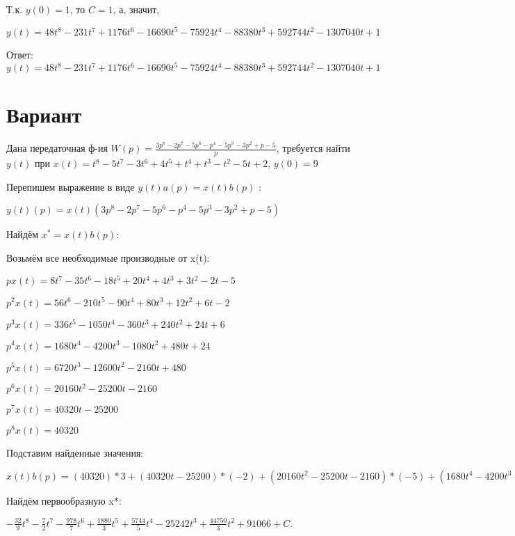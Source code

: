 \documentclass{article}
\begin{document}
{{{{{Т.к. $y(0)=1$, то $C=1$, а, значит, 

$y(t)=48t^{8}-231t^{7}+1176t^{6}-16690t^{5}-75924t^{4}-88380t^{3}+592744t^{2}-1307040t+1$

Ответ: $y(t) = 48t^{8}-231t^{7}+1176t^{6}-16690t^{5}-75924t^{4}-88380t^{3}+592744t^{2}-1307040t+1$

\section{Вариант}

Дана передаточная ф-ия $W(p)=\frac{3p^{8}-2p^{7}-5p^{6}-p^{4}-5p^{3}-3p^{2}+p-5}{p}$, требуется найти $y(t)$ при $x(t)=t^{8}-5t^{7}-3t^{6}+4t^{5}+t^{4}+t^{3}-t^{2}-5t+2$, $y(0)=9$

Перепишем выражение в виде $y(t)a(p)=x(t)b(p)$ :

$y(t)(p)=x(t)(3p^{8}-2p^{7}-5p^{6}-p^{4}-5p^{3}-3p^{2}+p-5)$

Найдём $x^*=x(t)b(p)$:

Возьмём все необходимые производные от x(t):

$px(t)=8t^{7}-35t^{6}-18t^{5}+20t^{4}+4t^{3}+3t^{2}-2t-5$

$p^2x(t)=56t^{6}-210t^{5}-90t^{4}+80t^{3}+12t^{2}+6t-2$

$p^3x(t)=336t^{5}-1050t^{4}-360t^{3}+240t^{2}+24t+6$

$p^4x(t)=1680t^{4}-4200t^{3}-1080t^{2}+480t+24$

$p^5x(t)=6720t^{3}-12600t^{2}-2160t+480$

$p^6x(t)=20160t^{2}-25200t-2160$

$p^7x(t)=40320t-25200$

$p^8x(t)=40320$

Подставим найденные значения:

$x(t)b(p) = (40320)*3+(40320t-25200)*(-2)+(20160t^{2}-25200t-2160)*(-5)+(1680t^{4}-4200t^{3}-1080t^{2}+480t+24)*(-1)+(336t^{5}-1050t^{4}-360t^{3}+240t^{2}+24t+6)*(-5)+(56t^{6}-210t^{5}-90t^{4}+80t^{3}+12t^{2}+6t-2)*(-3)+(8t^{7}-35t^{6}-18t^{5}+20t^{4}+4t^{3}+3t^{2}-2t-5)*1+(8t^{7}-35t^{6}-18t^{5}+20t^{4}+4t^{3}+3t^{2}-2t-5)*(-5)=-32t^{7}-28t^{6}-978t^{5}+3760t^{4}+5744t^{3}-100968t^{2}+44750t$





Найдём первообразную x*:

$-\frac{32}{9}t^{8}-\frac{7}{2}t^{7}-\frac{978}{7}t^{6}+\frac{1880}{3}t^{5}+\frac{5744}{5}t^{4}-25242t^{3}+\frac{44750}{3}t^{2}+91066+C.$

}}}}}
\end{document}

